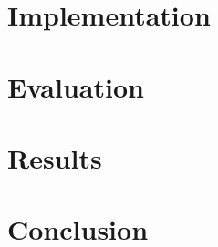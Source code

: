 \documentclass[notitlepage,11pt]{article}
\begin{document}
\section{Implementation}
\label{sec:implementation}


\section{Evaluation}
\label{sec:evaluation}


\section{Results}
\label{sec:results}


\section{Conclusion}
\label{sec:conclusion}


\newpage
\printbibliography
\end{document}
